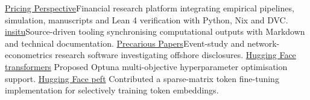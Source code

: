 \begin{cvskills}
  \cvskill
  {\href{https://github.com/marcusinthesky/PricingPerspective}{Pricing
  Perspective}}{Financial research platform integrating empirical
    pipelines, simulation, manuscripts and Lean 4 verification with
  Python, Nix and DVC.}
  \cvskill
  {\href{https://marcusinthesky.github.io/insitu/}{insitu}}{Source-driven
    tooling synchronising computational outputs with Markdown and
  technical documentation.}
  \cvskill
  {\href{https://github.com/marcusinthesky/precarious-papers}{Precarious
  Papers}}{Event-study and network-econometrics research software
  investigating offshore disclosures.}
  \cvskill
  {\href{https://github.com/huggingface/transformers/issues/25657}{Hugging
  Face transformers}}
  {Proposed Optuna multi-objective hyperparameter optimisation support.}
  \cvskill
  {\href{https://github.com/huggingface/peft/pull/1541}{Hugging Face peft}}
  {Contributed a sparse-matrix token fine-tuning implementation for
  selectively training token embeddings.}
\end{cvskills}
